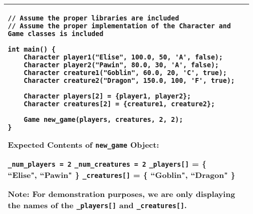 \begin{longtable}{|p{1.7in}|p{4.3in}|}
\begin{example}
\begin{verbatim}
// Assume the proper libraries are included
// Assume the proper implementation of the Character and Game classes is included

int main() {
    Character player1("Elise", 100.0, 50, 'A', false);
    Character player2("Pawin", 80.0, 30, 'A', false);
    Character creature1("Goblin", 60.0, 20, 'C', true);
    Character creature2("Dragon", 150.0, 100, 'F', true);

    Character players[2] = {player1, player2};
    Character creatures[2] = {creature1, creature2};

    Game new_game(players, creatures, 2, 2);
}
\end{verbatim}
\end{example}

\textbf{Expected Contents of \texttt{new_game} Object:} 

\vspace{5pt}
\texttt{_num_players = 2} \newline
\texttt{_num_creatures = 2} \newline
\texttt{_players[]} = \{ ``Elise", ``Pawin" \} \newline
\texttt{_creatures[]} = \{ ``Goblin", ``Dragon" \} \newline 

Note: For demonstration purposes, we are only displaying the names of the \texttt{_players[]} and \texttt{_creatures[]}. 
\vspace{5pt} \\ \hline
\end{longtable}


